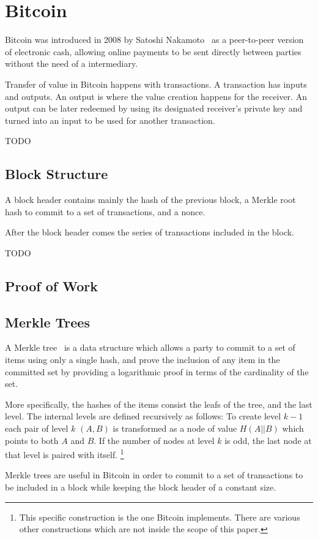 \section{Bitcoin}
Bitcoin was introduced in 2008 by Satoshi Nakamoto~\cite{bitcoin} as a
peer-to-peer version of electronic cash, allowing online payments to be sent
directly between parties without the need of a intermediary.

Transfer of value in Bitcoin happens with transactions. A transaction has
inputs and outputs. An output is where the value creation happens for the
receiver. An output can be later redeemed by using its designated receiver's
private key and turned into an input to be used for another transaction.

TODO

\subsection{Block Structure}
A block header contains mainly the hash of the previous block, a Merkle root
hash to commit to a set of transactions, and a nonce.

After the block header comes the series of transactions included in the block.

TODO

\subsection{Proof of Work}
\subsection{Merkle Trees}
A Merkle tree~\cite{merkle} is a data structure which allows a party to
commit to a set of items using only a single hash, and prove the inclusion of
any item in the committed set by providing a logarithmic proof in terms of the
cardinality of the set.

More specifically, the hashes of the items consist the leafs of the tree, and
the last level. The internal levels are defined recursively as follows: To
create level $k-1$ each pair of level $k$ $(A, B)$ is transformed as a node
of value $H(A || B)$ which points to both $A$ and $B$. If the number of nodes
at level $k$ is odd, the last node at that level is paired with itself.
\footnote{This specific construction is the one Bitcoin implements. There are
various other constructions which are not inside the scope of this paper.}

Merkle trees are useful in Bitcoin in order to commit to a set of
transactions to be included in a block while keeping the block header of a
constant size.

